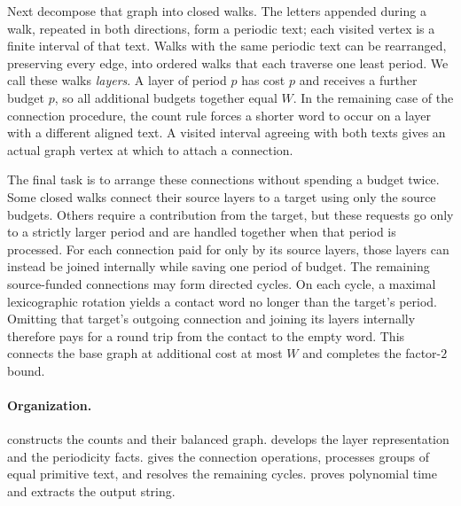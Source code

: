 Next decompose that graph into closed walks. The letters appended during a walk, repeated in both directions, form a periodic text; each visited vertex is a finite interval of that text. Walks with the same periodic text can be rearranged, preserving every edge, into ordered walks that each traverse one least period. We call these walks \emph{layers}. A layer of period $p$ has cost $p$ and receives a further budget $p$, so all additional budgets together equal $W$. In the remaining case of the connection procedure, the count rule forces a shorter word to occur on a layer with a different aligned text. A visited interval agreeing with both texts gives an actual graph vertex at which to attach a connection.

The final task is to arrange these connections without spending a budget twice. Some closed walks connect their source layers to a target using only the source budgets. Others require a contribution from the target, but these requests go only to a strictly larger period and are handled together when that period is processed. For each connection paid for only by its source layers, those layers can instead be joined internally while saving one period of budget. The remaining source-funded connections may form directed cycles. On each cycle, a maximal lexicographic rotation yields a contact word no longer than the target's period. Omitting that target's outgoing connection and joining its layers internally therefore pays for a round trip from the contact to the empty word. This connects the base graph at additional cost at most $W$ and completes the factor-$2$ bound.

\paragraph{Organization.}
 constructs the counts and their balanced graph.  develops the layer representation and the periodicity facts.  gives the connection operations,  processes groups of equal primitive text, and  resolves the remaining cycles.  proves polynomial time and extracts the output string.

